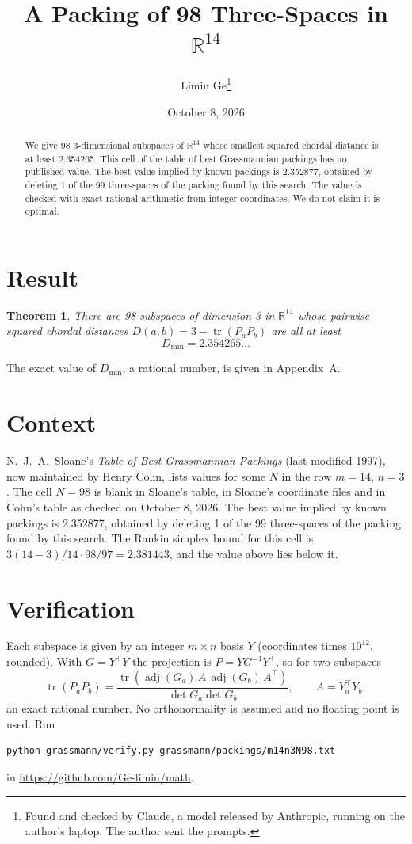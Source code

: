 \documentclass[11pt,a4paper]{article}
\title{A Packing of 98 Three-Spaces in $\mathbb{R}^{14}$}
\author{Limin Ge\thanks{Found and checked by Claude, a model released by Anthropic, running on the author's laptop. The author sent the prompts.}}
\date{October 8, 2026}
\newtheorem*{theorem}{Theorem}
\begin{document}
\maketitle
\begin{abstract}
We give 98 3-dimensional subspaces of $\mathbb{R}^{14}$ whose smallest squared chordal distance is at least 2.354265. This cell of the table of best Grassmannian packings has no published value. The best value implied by known packings is 2.352877, obtained by deleting 1 of the 99 three-spaces of the packing found by this search. The value is checked with exact rational arithmetic from integer coordinates. We do not claim it is optimal.
\end{abstract}

\section{Result}
\begin{theorem}
There are 98 subspaces of dimension 3 in $\mathbb{R}^{14}$ whose pairwise squared chordal distances $D(a,b) = 3 - \operatorname{tr}(P_aP_b)$ are all at least
\[ D_{\min} = 2.354265\ldots \]
\end{theorem}
The exact value of $D_{\min}$, a rational number, is given in Appendix~A.


\section{Context}
N.~J.~A.~Sloane's \emph{Table of Best Grassmannian Packings} (last modified 1997), now maintained by Henry Cohn, lists values for some $N$ in the row $m=14$, $n=3$. The cell $N=98$ is blank in Sloane's table, in Sloane's coordinate files and in Cohn's table as checked on October 8, 2026. The best value implied by known packings is 2.352877, obtained by deleting 1 of the 99 three-spaces of the packing found by this search. The Rankin simplex bound for this cell is $3(14-3)/14\cdot 98/97 = 2.381443$, and the value above lies below it.


\section{Verification}
Each subspace is given by an integer $m\times n$ basis $Y$ (coordinates times $10^{12}$, rounded). With $G=Y^\top Y$ the projection is $P=YG^{-1}Y^\top$, so for two subspaces
\[ \operatorname{tr}(P_aP_b)=\frac{\operatorname{tr}(\operatorname{adj}(G_a)\,A\,\operatorname{adj}(G_b)\,A^\top)}{\det G_a\det G_b},\qquad A=Y_a^\top Y_b, \]
an exact rational number. No orthonormality is assumed and no floating point is used. Run
\begin{verbatim}
python grassmann/verify.py grassmann/packings/m14n3N98.txt
\end{verbatim}
in \url{https://github.com/Ge-limin/math}.
\end{document}
